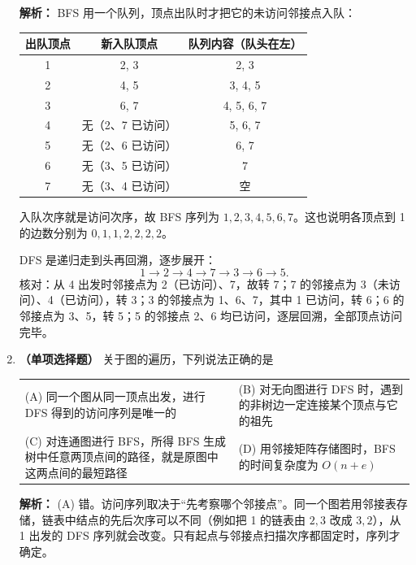 \begin{enumerate}
\ifshowsolutions\par\noindent\textbf{解析：} BFS 用一个队列，顶点出队时才把它的未访问邻接点入队：

\begin{center}
\small
\begin{tabular}{|c|c|c|}
\hline
出队顶点 & 新入队顶点 & 队列内容（队头在左）\\
\hline
1 & 2, 3 & 2, 3 \\
2 & 4, 5 & 3, 4, 5 \\
3 & 6, 7 & 4, 5, 6, 7 \\
4 & 无（2、7 已访问） & 5, 6, 7 \\
5 & 无（2、6 已访问） & 6, 7 \\
6 & 无（3、5 已访问） & 7 \\
7 & 无（3、4 已访问） & 空 \\
\hline
\end{tabular}
\end{center}

入队次序就是访问次序，故 BFS 序列为 $1,2,3,4,5,6,7$。这也说明各顶点到 1 的边数分别为 $0,1,1,2,2,2,2$。

DFS 是递归走到头再回溯，逐步展开：
\[
1\to2\to4\to7\to3\to6\to5.
\]
核对：从 4 出发时邻接点为 2（已访问）、7，故转 7；7 的邻接点为 3（未访问）、4（已访问），转 3；3 的邻接点为 1、6、7，其中 1 已访问，转 6；6 的邻接点为 3、5，转 5；5 的邻接点 2、6 均已访问，逐层回溯，全部顶点访问完毕。

\else \answerarea[10] \fi

\item \textbf{（单项选择题）} 关于图的遍历，下列说法正确的是
\begin{center}
\begin{tabular}{@{}p{7.5cm}p{7.5cm}@{}}
(A) 同一个图从同一顶点出发，进行 DFS 得到的访问序列是唯一的 & (B) 对无向图进行 DFS 时，遇到的非树边一定连接某个顶点与它的祖先 \\[6pt]
(C) 对连通图进行 BFS，所得 BFS 生成树中任意两顶点间的路径，就是原图中这两点间的最短路径 & (D) 用邻接矩阵存储图时，BFS 的时间复杂度为 $O(n+e)$
\end{tabular}
\end{center}

\ifshowsolutions\par\noindent\textbf{解析：} (A) 错。访问序列取决于“先考察哪个邻接点”。同一个图若用邻接表存储，链表中结点的先后次序可以不同（例如把 1 的链表由 $2,3$ 改成 $3,2$），从 1 出发的 DFS 序列就会改变。只有起点与邻接点扫描次序都固定时，序列才确定。


\end{enumerate}
